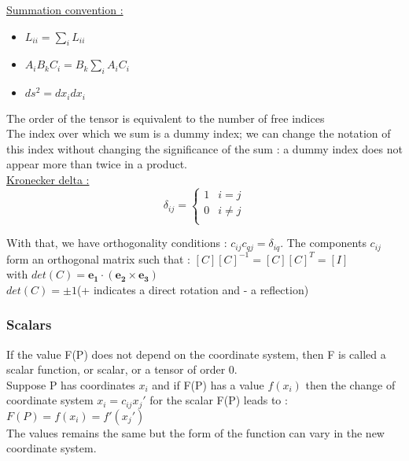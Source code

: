 \documentclass[../main.tex]{subfiles}
\begin{document}
\quad \underline{Summation convention :}\\
\begin{itemize}
    \item $L_{ii} = \sum_i L_{ii}$\\
    \item $A_iB_kC_i = B_k \sum_i A_iC_i$\\
    \item $ds^2 = dx_idx_i$\\
\end{itemize}

\warning The order of the tensor is equivalent to the number of free indices\\

The index over which we sum is a dummy index; we can change the notation of this index without changing the significance of the sum : a dummy index does not appear more than twice in a product.\\

\quad \underline{Kronecker delta :}\\
\begin{equation}
    \delta_{ij} = \begin{cases}
        1 & i=j\\
        0 & i\neq j\\
    \end{cases}
\end{equation}

With that, we have orthogonality conditions : $c_{ij}c_{qj} = \delta_{iq}$. The components $c_{ij}$ form an orthogonal matrix such that : $[C][C]^{-1} = [C][C]^T = [I]$\\
with $det(C) = \mathbf{e_1} \cdot (\mathbf{e_2}\times \mathbf{e_3})$\\
$det(C) = \pm 1$(+ indicates a direct rotation and - a reflection)\\

\subsubsection{Scalars}
If the value F(P) does not depend on the coordinate system, then F is called a scalar function, or scalar, or a tensor of order 0. \\
Suppose P has coordinates $x_i$ and if F(P) has a value $f(x_i)$ then the change of coordinate system $x_i = c_{ij}x_j'$ for the scalar F(P) leads to : $F(P) = f(x_i) = f'(x_j')$\\
The values remains the same but the form of the function can vary in the new coordinate system.\\
\end{document}
